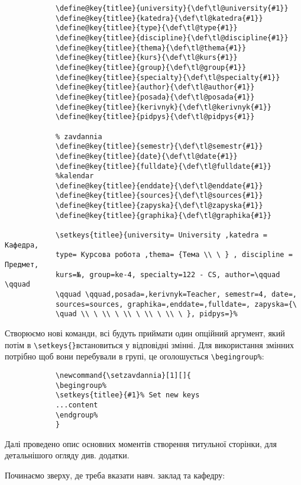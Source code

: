 \begin{lstlisting}
			\define@key{titlee}{university}{\def\tl@university{#1}}
			\define@key{titlee}{katedra}{\def\tl@katedra{#1}}
			\define@key{titlee}{type}{\def\tl@type{#1}}
			\define@key{titlee}{discipline}{\def\tl@discipline{#1}}
			\define@key{titlee}{thema}{\def\tl@thema{#1}}
			\define@key{titlee}{kurs}{\def\tl@kurs{#1}}
			\define@key{titlee}{group}{\def\tl@group{#1}}
			\define@key{titlee}{specialty}{\def\tl@specialty{#1}}
			\define@key{titlee}{author}{\def\tl@author{#1}}
			\define@key{titlee}{posada}{\def\tl@posada{#1}}
			\define@key{titlee}{kerivnyk}{\def\tl@kerivnyk{#1}}
			\define@key{titlee}{pidpys}{\def\tl@pidpys{#1}}
			
			% zavdannia
			\define@key{titlee}{semestr}{\def\tl@semestr{#1}}
			\define@key{titlee}{date}{\def\tl@date{#1}}
			\define@key{titlee}{fulldate}{\def\tl@fulldate{#1}}
			%kalendar
			\define@key{titlee}{enddate}{\def\tl@enddate{#1}}
			\define@key{titlee}{sources}{\def\tl@sources{#1}}
			\define@key{titlee}{zapyska}{\def\tl@zapyska{#1}}
			\define@key{titlee}{graphika}{\def\tl@graphika{#1}}
			
			\setkeys{titlee}{university= University ,katedra = Kафедра,
			type= Курсова робота ,thema= {Тема \\ \ } , discipline = Предмет,
			kurs=№, group=ke-4, specialty=122 - CS, author=\qquad \qquad
			\qquad \qquad,posada=,kerivnyk=Teacher, semestr=4, date=,
			sources=sources, graphika=,enddate=,fulldate=, zapyska={\
			\quad \\ \ \\ \ \\ \ \\ \ \\ \ }, pidpys=}%			
\end{lstlisting}


Створюємо нові команди, всі будуть приймати один опційний аргумент, який потім в \verb|\setkeys{}|встановиться у відповідні змінні. Для використання змінних потрібно щоб вони перебували в групі, це оголошується \verb|\begingroup%|:

\begin{lstlisting}
			\newcommand{\setzavdannia}[1][]{
			\begingroup%
			\setkeys{titlee}{#1}% Set new keys
			...content
			\endgroup%
			}
\end{lstlisting}

Далі проведено опис основних моментів створення титульної сторінки, для детальнішого огляду див. додатки.

Починаємо зверху, де треба вказати навч. заклад та кафедру:

